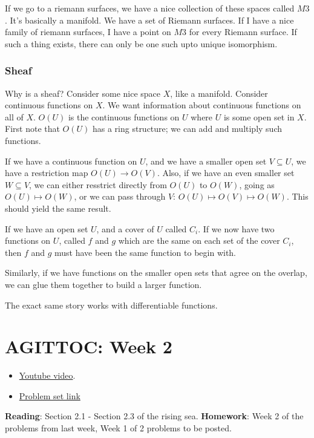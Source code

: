 \documentclass{book}
\theoremstyle{definition}
\begin{document}
If we go to a riemann surfaces, we have a nice collection of these spaces
called $M3$. It's basically a manifold. We have a set of Riemann surfaces.
If I have a nice family of riemann surfaces, I have a point on $M3$ for
every Riemann surface. If such a thing exists, there can only be one such
upto unique isomorphism.

\subsection{Sheaf}
Why is a sheaf? Consider some nice space $X$, like a manifold. Consider continuous
functions on $X$. We want information about continuous functions on all of $X$.
$O(U)$ is the continuous functions on $U$  where $U$ is some open set in $X$.
First note that $O(U)$ has a ring structure; we can add and multiply such functions.

If we have a continuous function on $U$, and we have a smaller open set $V \subseteq U$,
we have a restriction map $O(U) \rightarrow O(V)$. Also, if we have an even smaller
set $W \subseteq V$, we can either resstrict directly from $O(U)$ to $O(W)$, going
as $O(U) \mapsto O(W)$, or we can pass through $V$: $O(U) \mapsto O(V) \mapsto O(W)$. 
This should yield the same result.


If we have an open set $U$, and a cover of $U$ called ${C_i}$.  If we now have
two functions on $U$, called $f$ and $g$ which are the same on each set
of the cover $C_i$, then $f$ and $g$ must have been the same function to begin
with.

Similarly, if we have functions on the smaller open sets that agree on the overlap,
we can glue them together to build a larger function.


The exact same story works with differentiable functions.

\chapter{AGITTOC: Week 2}
\begin{itemize}
\item \href{https://www.youtube.com/watch?v=mqt1f8owKrU}{Youtube video}.
\item \href{https://math216.wordpress.com/2020/07/06/readings-and-problem-set-for-after-the-second-pseudolecture/}{Problem set link}
\end{itemize}

\textbf{Reading}: Section 2.1 - Section 2.3 of the rising sea. \textbf{Homework}: Week 2
of the problems from last week, Week 1 of 2 problems to be posted.
\end{document}
